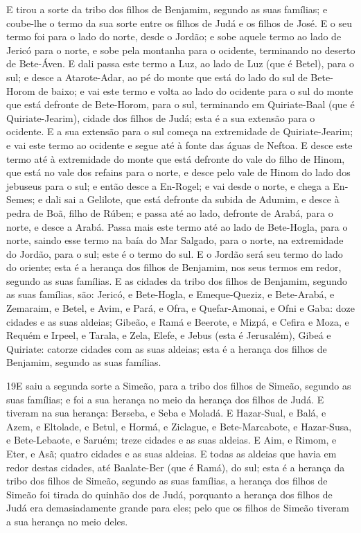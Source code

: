 E tirou a sorte da tribo dos filhos de Benjamim, segundo as suas
famílias; e coube-lhe o termo da sua sorte entre os filhos de Judá e
os filhos de José. E o seu termo foi para o lado do norte,
desde o Jordão; e sobe aquele termo ao lado de Jericó para o norte,
e sobe pela montanha para o ocidente, terminando no deserto de
Bete-Áven. E dali passa este termo a Luz, ao lado de Luz (que
é Betel), para o sul; e desce a Atarote-Adar, ao pé do monte que
está do lado do sul de Bete-Horom de baixo; e vai este termo
e volta ao lado do ocidente para o sul do monte que está defronte de
Bete-Horom, para o sul, terminando em Quiriate-Baal (que é
Quiriate-Jearim), cidade dos filhos de Judá; esta é a sua extensão
para o ocidente. E a sua extensão para o sul começa na
extremidade de Quiriate-Jearim; e vai este termo ao ocidente e segue
até à fonte das águas de Neftoa. E desce este termo até à
extremidade do monte que está defronte do vale do filho de Hinom,
que está no vale dos refains para o norte, e desce pelo vale de
Hinom do lado dos jebuseus para o sul; e então desce a En-Rogel;
e vai desde o norte, e chega a En-Semes; e dali sai a
Gelilote, que está defronte da subida de Adumim, e desce à pedra de
Boã, filho de Rúben; e passa até ao lado, defronte de Arabá,
para o norte, e desce a Arabá. Passa mais este termo até ao
lado de Bete-Hogla, para o norte, saindo esse termo na baía do Mar
Salgado, para o norte, na extremidade do Jordão, para o sul; este é
o termo do sul. E o Jordão será seu termo do lado do oriente;
esta é a herança dos filhos de Benjamim, nos seus termos em redor,
segundo as suas famílias. E as cidades da tribo dos filhos de
Benjamim, segundo as suas famílias, são: Jericó, e Bete-Hogla, e
Emeque-Queziz, e Bete-Arabá, e Zemaraim, e Betel, e
Avim, e Pará, e Ofra, e Quefar-Amonai, e Ofni e Gaba: doze
cidades e as suas aldeias; Gibeão, e Ramá e Beerote, e
Mizpá, e Cefira e Moza, e Requém e Irpeel, e Tarala, e
Zela, Elefe, e Jebus (esta é Jerusalém), Gibeá e Quiriate: catorze
cidades com as suas aldeias; esta é a herança dos filhos de
Benjamim, segundo as suas famílias.

\medskip

\lettrine{19} E saiu a segunda sorte a Simeão, para a tribo
dos filhos de Simeão, segundo as suas famílias; e foi a sua herança
no meio da herança dos filhos de Judá. E tiveram na sua herança:
Berseba, e Seba e Moladá. E Hazar-Sual, e Balá, e Azem, e
Eltolade, e Betul, e Hormá, e Ziclague, e Bete-Marcabote, e
Hazar-Susa, e Bete-Lebaote, e Saruém; treze cidades e as suas
aldeias. E Aim, e Rimom, e Eter, e Asã; quatro cidades e as suas
aldeias. E todas as aldeias que havia em redor destas cidades,
até Baalate-Ber (que é Ramá), do sul; esta é a herança da tribo dos
filhos de Simeão, segundo as suas famílias, a herança dos filhos
de Simeão foi tirada do quinhão dos de Judá, porquanto a herança dos
filhos de Judá era demasiadamente grande para eles; pelo que os
filhos de Simeão tiveram a sua herança no meio deles.

